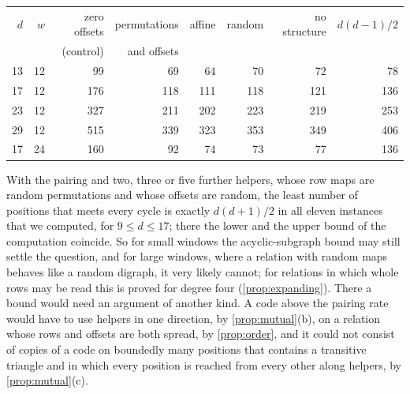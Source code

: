 \begin{center}\small
\begin{tabular}{@{}rrrrrrrr@{}}
\toprule
$d$ & $w$ & zero offsets & permutations & affine & random & no structure & $d(d-1)/2$ \\
 & & (control) & and offsets & & & & \\
\midrule
13 & 12 & 99 & 69 & 64 & 70 & 72 & 78 \\
17 & 12 & 176 & 118 & 111 & 118 & 121 & 136 \\
23 & 12 & 327 & 211 & 202 & 223 & 219 & 253 \\
29 & 12 & 515 & 339 & 323 & 353 & 349 & 406 \\
17 & 24 & 160 & 92 & 74 & 73 & 77 & 136 \\
\bottomrule
\end{tabular}
\end{center}

\medskip
With the pairing and two, three or five further helpers, whose row maps are random permutations and whose offsets
are random, the least number of positions that meets every cycle is exactly $d(d+1)/2$ in all eleven instances that
we computed, for $9\le d\le17$; there the lower and the upper bound of the computation coincide. So for small windows
the acyclic-subgraph bound may still settle the question, and for large windows, where a relation with random maps
behaves like a random digraph, it very likely cannot; for relations in which whole rows may be read this is proved
for degree four (\cref{prop:expanding}). There a bound would need an argument of another kind. A code
above the pairing rate would have to use helpers in one direction, by \cref{prop:mutual}(b), on a relation whose rows
and offsets are both spread, by \cref{prop:order}, and it could not consist of copies of a code on boundedly many
positions that contains a transitive triangle and in which every position is reached from every other along helpers,
by \cref{prop:mutual}(c).

